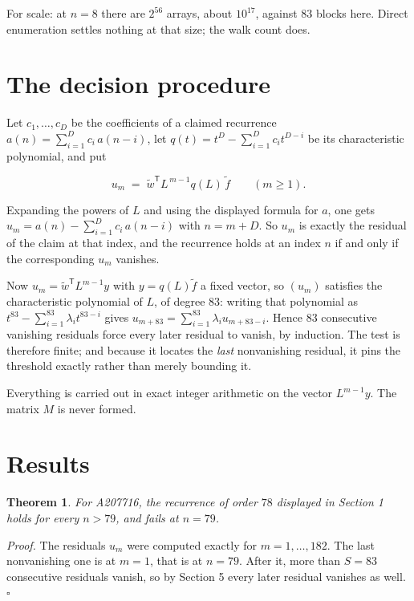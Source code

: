 \documentclass[11pt]{article}
\newtheorem{theorem}{Theorem}
\theoremstyle{definition}
\begin{document}
For scale: at $n = 8$ there are $2^{56}$ arrays, about $10^{17}$, against $83$ blocks here. Direct enumeration settles nothing at that size; the walk count does.

\section{The decision procedure}

Let $c_1,\dots,c_D$ be the coefficients of a claimed recurrence $a(n) = \sum_{i=1}^{D} c_i\,a(n-i)$, let $q(t) = t^{D} - \sum_{i=1}^{D} c_i t^{D-i}$ be its characteristic polynomial, and put

\[u_m \;=\; \tilde w^{\mathsf T} L^{\,m-1} q(L)\,\tilde f \qquad (m \ge 1).\]

Expanding the powers of $L$ and using the displayed formula for $a$, one gets $u_m = a(n) - \sum_{i=1}^{D} c_i\,a(n-i)$ with $n = m + D$. So $u_m$ is exactly the residual of the claim at that index, and the recurrence holds at an index $n$ if and only if the corresponding $u_m$ vanishes.

Now $u_m = \tilde w^{\mathsf T} L^{m-1} y$ with $y = q(L)\tilde f$ a fixed vector, so $(u_m)$ satisfies the characteristic polynomial of $L$, of degree $83$: writing that polynomial as $t^{83} - \sum_{i=1}^{83} \lambda_i t^{83-i}$ gives $u_{m+83} = \sum_{i=1}^{83} \lambda_i u_{m+83-i}$. Hence $83$ consecutive vanishing residuals force every later residual to vanish, by induction. The test is therefore finite; and because it locates the {\itshape last} nonvanishing residual, it pins the threshold exactly rather than merely bounding it.

Everything is carried out in exact integer arithmetic on the vector $L^{m-1}y$. The matrix $M$ is never formed.

\section{Results}

\begin{theorem} For A207716, the recurrence of order $78$ displayed in Section 1 holds for every $n > 79$, and fails at $n = 79$.\end{theorem}

{\itshape Proof.} The residuals $u_m$ were computed exactly for $m = 1,\dots,182$. The last nonvanishing one is at $m = 1$, that is at $n = 79$. After it, more than $S = 83$ consecutive residuals vanish, so by Section 5 every later residual vanishes as well. $\square$
\end{document}
